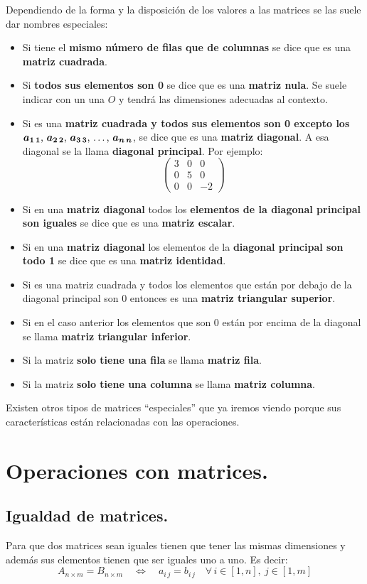 \documentclass[a4paper,11pt,answers]{exam}
\begin{document}
Dependiendo de la forma y la disposición de los valores a las matrices se las suele dar nombres especiales:
\begin{itemize}
	\item Si tiene el \textbf{mismo número de filas que de columnas} se dice que es una \textbf{matriz cuadrada}.
	\item Si \textbf{todos sus elementos son 0} se dice que es una \textbf{matriz nula}. Se suele indicar con un una $O$ y tendrá las dimensiones adecuadas al contexto.
	\item Si es una \textbf{matriz cuadrada y todos sus elementos son 0 excepto los $\boldsymbol{a_{1\,1}$, $a_{2\,2}$, $a_{3\,3}$, \dots, $a_{n\,n}}$}, se dice que es una \textbf{matriz diagonal}. A esa diagonal se la llama \textbf{diagonal principal}. Por ejemplo:\\
	\[\left(\begin{array}{rrr}
		3&0&0\\0&5&0\\
		0&0&-2
	\end{array}\right)\]
	\item Si en una \textbf{matriz diagonal} todos los \textbf{elementos de la diagonal principal son iguales} se dice que es una \textbf{matriz escalar}.
	\item Si en una \textbf{matriz diagonal} los elementos de la \textbf{diagonal principal son todo 1} se dice que es una \textbf{matriz identidad}.
	\item Si es una matriz cuadrada y todos los elementos que están por debajo de la diagonal principal son 0 entonces es una \textbf{matriz triangular superior}.
	\item Si en el caso anterior los elementos que son 0 están por encima de la diagonal se llama \textbf{matriz triangular inferior}.
	\item Si la matriz \textbf{solo tiene una fila} se llama \textbf{matriz fila}.
	\item Si la matriz \textbf{solo tiene una columna} se llama \textbf{matriz columna}.
\end{itemize}
Existen otros tipos de matrices ``especiales'' que ya iremos viendo porque sus características están relacionadas con las operaciones.
\section{Operaciones con matrices.}
\subsection{Igualdad de matrices.}
Para que dos matrices sean iguales tienen que tener las mismas dimensiones y además sus elementos tienen que ser iguales uno a uno. Es decir:
\[A_{n \times m} = B_{n \times m} \quad \Longleftrightarrow \quad a_{i\,j} = b_{i\,j}\quad \forall\, i\in[1,n],\ j\in[1,m]\]
\end{document}
